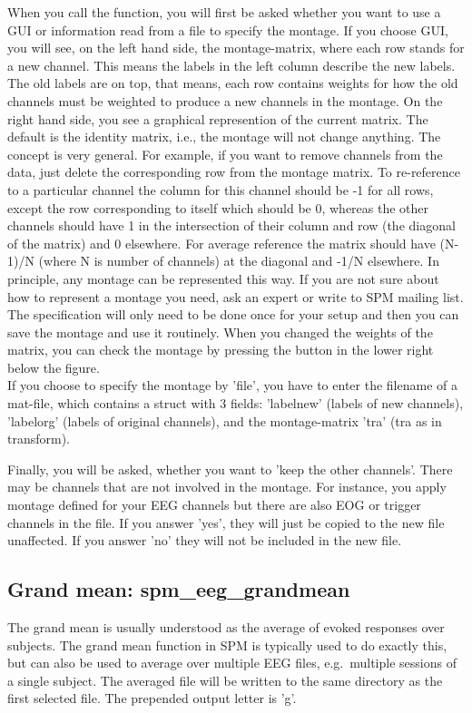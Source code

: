 When you call the function, you will first be asked whether you want 
to use a GUI or information read from a file to specify the montage. 
If you choose GUI, you will see, on the left hand side, the montage-matrix,
where each row stands for a new channel. This means the labels in the left 
column describe the new labels. The old labels are on top, that means, each 
row contains weights for how the old channels must be weighted to produce a new 
channels in the montage. On the right hand side, you see a graphical represention 
of the current matrix. The default is the identity matrix, i.e., the montage will
not change anything. The concept is very general. For example, if you want to 
remove channels from the data, just delete the corresponding row from the montage matrix.
To re-reference to a particular channel the column for this channel should be -1 for
all rows, except the row corresponding to itself which should be 0, whereas the other channels 
should have 1 in the intersection of their column and row (the diagonal of the matrix) and 0 elsewhere.
For average reference the matrix should have (N-1)/N (where N is number of channels) at the diagonal and -1/N elsewhere.
In principle, any montage can be represented this way. If you are not sure about how to represent a montage you need,
ask an expert or write to SPM mailing list. The specification will only need to be done once for your setup and then you can
save the montage and use it routinely. When you changed the weights of the matrix, you can check the montage by pressing 
the button in the lower right below the figure.
\\
If you choose to specify the montage by 'file', you have to enter the filename of a mat-file, 
which contains a struct with 3 fields: 'labelnew' (labels of new channels), 'labelorg' (labels of original channels), 
and the montage-matrix 'tra' (tra as in transform).

Finally, you will be asked, whether you want to 'keep the other channels'. There may be channels that are
not involved in the montage. For instance, you apply montage defined for your EEG channels but there are also
EOG or trigger channels in the file. If you answer 'yes', they will just be copied to the new file unaffected.
If you answer 'no' they will not be included in the new file.


\subsection{Grand mean: spm\_eeg\_grandmean}
The grand mean is usually understood as the average of evoked
responses over subjects. The grand mean function in SPM is typically
used to do exactly this, but can also be used to average over multiple 
EEG files, e.g.~multiple sessions of a single subject. The averaged
file will be written to the same directory as the first selected
file. The prepended output letter is 'g'.

